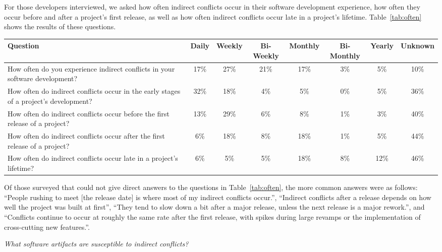 \documentclass[conference]{IEEEtran}
\begin{document}
For those developers interviewed, we asked how often indirect conflicts occur in their software development experience,
how often they occur before and after a project's first release, as well as how often indirect conflicts occur late
in a project's lifetime. Table~\ref{tab:often} shows the results of these questions.

\begin{table*}[tb!]
\begin{center}
\begin{tabular}{| p{7cm} | c | c | c | c | c | c | c |}
\hline
Question & Daily & Weekly & Bi-Weekly & Monthly & Bi-Monthly & Yearly & Unknown \\
\hline
\hline
How often do you experience indirect conflicts in your software development? & 17\% & 27\% & 21\% & 17\% & 3\% & 5\% & 10\% \\ \hline
How often do indirect conflicts occur in the early stages of a project’s development? & 32\% & 18\% & 4\% & 5\% & 0\% & 5\% & 36\% \\ \hline
How often do indirect conflicts occur before the first release of a project? & 13\% & 29\% & 6\% & 8\% & 1\% & 3\% & 40\% \\ \hline
How often do indirect conflicts occur after the first release of a project? & 6\% & 18\% & 8\% & 18\% & 1\% & 5\% & 44\% \\ \hline
How often do indirect conflicts occur late in a project’s lifetime? & 6\% & 5\% & 5\% & 18\% & 8\% & 12\% & 46\% \\ \hline
\end{tabular}
\end{center}
\caption{Results of survey questions to how often indirect conflicts occur, in terms of percentage
of developers surveyed.\label{tab:often}}
\end{table*}

Of those surveyed that could not give direct answers to the questions in Table~\ref{tab:often}, the more common answers were 
as follows: ``People rushing to meet [the release date] is where most of my indirect conflicts occur.'', ``Indirect conflicts
after a release depends on how well the project was built at first'', ``They tend to slow down a bit after a major release, 
unless the next release is a major rework.'', and ``Conflicts continue to occur at roughly the same rate after the first release,
with spikes during large revamps or the implementation of cross-cutting new features.''.

\begin{description}[topsep=6pt]
	\item[RQ3] \textit{What software artifacts are susceptible to indirect conflicts?}
\end{description}
\end{document}
